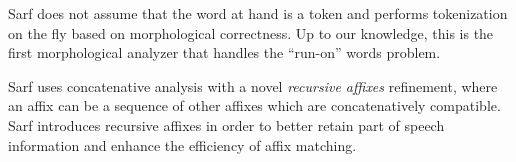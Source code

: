 \documentclass[11pt]{article}
\begin{document}
Sarf does not assume that the word at hand is a token and
performs tokenization on the fly based on morphological correctness.
Up to our knowledge, this is the first morphological analyzer that 
handles the ``run-on'' words problem. 

Sarf uses concatenative analysis with a novel %
{\em recursive affixes} refinement,
where an affix can be a sequence of other affixes which are concatenatively compatible.
Sarf introduces recursive affixes in order to
better retain part of speech information and enhance the 
efficiency of affix matching. 
\end{document}
